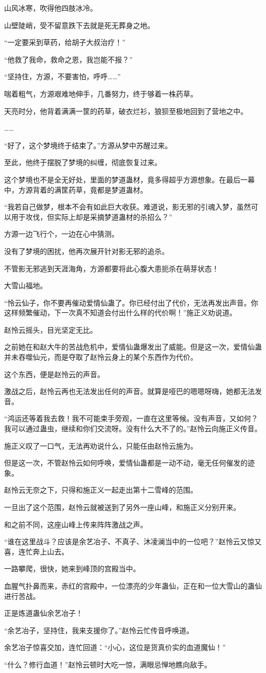 \begin{this_body}
山风冰寒，吹得他四肢冰冷。

山壁陡峭，受不留意跌下去就是死无葬身之地。

“一定要采到草药，给胡子大叔治疗！”

“他救了我命，救命之恩，我岂能不报？”

“坚持住，方源，不要害怕，呼呼……”

喘着粗气，方源艰难地伸手，几番努力，终于够着一株药草。

天亮时分，他背着满满一筐的药草，破衣烂衫，狼狈至极地回到了营地之中。

……

“好了，这个梦境终于结束了。”方源从梦中苏醒过来。

至此，他终于摆脱了梦境的纠缠，彻底恢复过来。

这个梦境也不是全无好处，里面的梦道蛊材，竟多得超乎方源想象。在最后一幕中，方源背着的满筐药草，竟都是梦道蛊材。

“我若自己做梦，根本不会有如此巨大收获。难道说，影无邪的引魂入梦，虽然可以用于攻伐，但实际上却是采摘梦道蛊材的杀招么？”

方源一边飞行个，一边在心中猜测。

没有了梦境的困扰，他再次展开针对影无邪的追杀。

不管影无邪逃到天涯海角，方源都要将此心腹大患扼杀在萌芽状态！

大雪山福地。

“怜云仙子，你不要再催动爱情仙蛊了。你已经付出了代价，无法再发出声音。你这样频繁催动，下一次真不知道会付出什么样的代价啊！”施正义劝说道。

赵怜云摇头，目光坚定无比。

之前她在和赵大牛的苦战危机中，爱情仙蛊爆发出了威能。但是这一次，爱情仙蛊并未吞噬仙元，而是夺取了赵怜云身上的某个东西作为代价。

这个东西，便是赵怜云的声音。

激战之后，赵怜云再也无法发出任何的声音。就算是哑巴的嗯嗯呀嗨，她都无法发音。

“鸿运还等着我去救！我不可能束手旁观，一直在这里等候。没有声音，又如何？我可以通过蛊虫，继续和你们交流呀。没有什么大不了的。”赵怜云向施正义传音。

施正义叹了一口气，无法再劝说什么，只能任由赵怜云施为。

但是这一次，不管赵怜云如何呼唤，爱情仙蛊都是一动不动，毫无任何催发的迹象。

赵怜云无奈之下，只得和施正义一起走出第十二雪峰的范围。

一旦出了这个范围，赵怜云就被送到了另外一座山峰，和施正义分别开来。

和之前不同，这座山峰上传来阵阵激战之声。

“谁在这里战斗？应该是余艺冶子、不真子、沐凌澜当中的一位吧？”赵怜云又惊又喜，连忙奔上山去。

一路攀爬，很快，她来到峰顶的宫殿当中。

血腥气扑鼻而来，赤红的宫殿中，一位漂亮的少年蛊仙，正在和一位大雪山的蛊仙进行苦战。

正是炼道蛊仙余艺冶子！

“余艺冶子，坚持住，我来支援你了。”赵怜云忙传音呼唤道。

余艺冶子惊喜交加，连忙回道：“小心，这位是货真价实的血道魔仙！”

“什么？修行血道！”赵怜云顿时大吃一惊，满眼忌惮地瞧向敌手。

\end{this_body}

